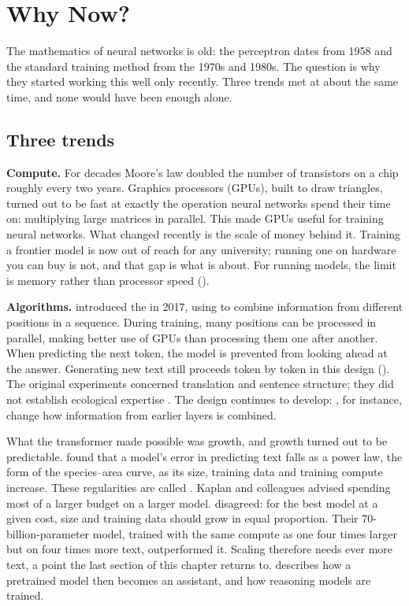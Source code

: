 \chapter{Why Now?}
\label{ch:whynow}

The mathematics of neural networks is old: the perceptron dates from 1958 and
the standard training method from the 1970s and 1980s. The question is why they
started working this well only recently. Three trends met at about the same
time, and none would have been enough alone.

\section{Three trends}

\textbf{Compute.} For decades Moore's law doubled the number of transistors on a
chip roughly every two years. Graphics processors (GPUs), built to draw
triangles, turned out to be fast at exactly the operation neural networks spend
their time on: multiplying large matrices in parallel. This made GPUs useful
for training neural networks. What changed recently is the scale of money
behind it. Training a frontier model is now out of reach for any university;
running one on hardware you can buy is not, and that gap is what
 is about. For running models, the limit is memory rather
than processor speed ().

\textbf{Algorithms.} \textcite{vaswani2017attention} introduced the
 in 2017, using  to combine information from
different positions in a sequence. During training, many positions can be
processed in parallel, making better use of GPUs than processing them one
after another. When predicting the next token, the model is prevented from
looking ahead at the answer. Generating new text still proceeds token by
token in this design (). The original experiments concerned translation and
sentence structure; they did not establish ecological expertise
\parencite{vaswani2017attention}. The design continues to develop:
\textcite{kimi2026attnres}, for instance, change how information from earlier
layers is combined.

What the transformer made possible was growth, and growth turned out to be
predictable. \textcite{kaplan2020scaling} found that a model's error in
predicting text falls as a power law, the form of the species--area curve, as
its size, training data and training compute increase. These regularities are
called . Kaplan and colleagues advised spending most of a
larger budget on a larger model. \textcite{hoffmann2022chinchilla} disagreed:
for the best model at a given cost, size and training data should grow in equal
proportion. Their 70-billion-parameter model, trained with the same compute as
one four times larger but on four times more text, outperformed it. Scaling
therefore needs ever more text, a point the last section of this chapter
returns to.  describes how a pretrained model then becomes
an assistant, and how reasoning models are trained.

